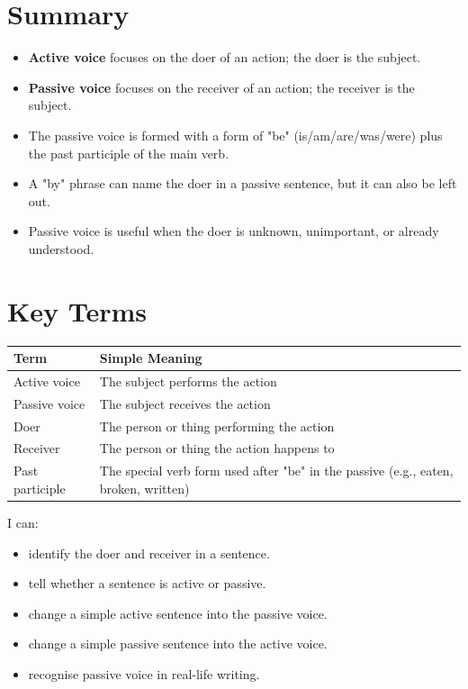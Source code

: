 \section{Summary}
\begin{summarybox}
\begin{itemize}
    \item \textbf{Active voice} focuses on the doer of an action; the doer is the subject.
    \item \textbf{Passive voice} focuses on the receiver of an action; the receiver is the subject.
    \item The passive voice is formed with a form of "be" (is/am/are/was/were) plus the past participle of the main verb.
    \item A "by" phrase can name the doer in a passive sentence, but it can also be left out.
    \item Passive voice is useful when the doer is unknown, unimportant, or already understood.
\end{itemize}
\end{summarybox}

\section{Key Terms}
\begin{table}[h!]
\centering
\begin{tabular}{|l|l|}
\hline
\textbf{Term} & \textbf{Simple Meaning} \\
\hline
Active voice & The subject performs the action \\
Passive voice & The subject receives the action \\
Doer & The person or thing performing the action \\
Receiver & The person or thing the action happens to \\
Past participle & The special verb form used after "be" in the passive (e.g., eaten, broken, written) \\
\hline
\end{tabular}
\end{table}

\begin{selfcheck}
I can:
\begin{itemize}
    \item identify the doer and receiver in a sentence.
    \item tell whether a sentence is active or passive.
    \item change a simple active sentence into the passive voice.
    \item change a simple passive sentence into the active voice.
    \item recognise passive voice in real-life writing.
\end{itemize}
\end{selfcheck}